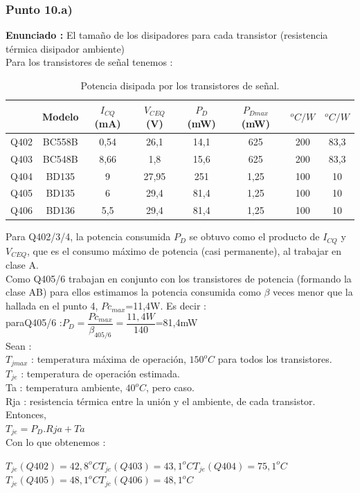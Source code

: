 \documentclass[12pt]{book}
\begin{document}
\subsubsection{Punto 10.a)}
\textbf{Enunciado : } El tamaño de los disipadores para cada transistor (resistencia térmica disipador ambiente)\\[1cm]
Para los transistores de señal tenemos :
\begin{table}[H]
\centering
\begin{tabular}{|l|c|c|c|c|c|c|c|}
\hline
&Modelo&$I_{CQ}$(mA)&$V_{CEQ}$(V)&$P_{D}$(mW)&$P_{Dmax}$(mW)&$^{o}C/W$&$^{o}C/W$\\
\hline
Q402&BC558B&0,54&26,1&14,1&625&200&83,3\\
\hline
Q403&BC548B&8,66&1,8&15,6&625&200&83,3\\
\hline
Q404&BD135&9&27,95&251&1,25&100&10\\
\hline
Q405&BD135&6&29,4&81,4&1,25&100&10\\
\hline
Q406&BD136&5,5&29,4&81,4&1,25&100&10\\
\hline
\end{tabular}
\caption{Potencia disipada por los transistores de señal.}
\label{PotenciaDeSenial}
\end{table}
Para Q402/3/4, la potencia consumida $P_{D}$ se obtuvo como el producto de $I_{CQ}$ y $V_{CEQ}$, que es el consumo máximo de potencia (casi permanente), al trabajar en clase A.\\
Como Q405/6 trabajan en conjunto con los transistores de potencia (formando la clase AB) para ellos estimamos la potencia consumida como $\beta$ veces menor que la hallada en el punto 4, $Pc_{max}$=11,4W. Es decir :\\
para\qquad Q405/6 :\quad $P_{D}=\dfrac{Pc_{max}}{\beta_{405/6}}=\dfrac{11,4W}{140}$=81,4mW\\
Sean :\\
$T_{jmax}$ : temperatura máxima de operación, $150^{o}C$ para todos los transistores.\\
$T_{je}$ : temperatura de operación estimada.\\
Ta : temperatura ambiente, $40^{o}C$, pero caso.\\
Rja : resistencia térmica entre la unión y el ambiente, de cada transistor.\\
Entonces,\\
$T_{je}=P_{D}$.$Rja+Ta$\\
Con lo que obtenemos :
\begin{center}
$T_{je}(Q402)=42,8^{o}C$\qquad $T_{je}(Q403)=43,1^{o}C$\qquad $T_{je}(Q404)=75,1^{o}C$\\
$T_{je}(Q405)=48,1^{o}C$\qquad $T_{je}(Q406)=48,1^{o}C$
\end{center}
\end{document}
